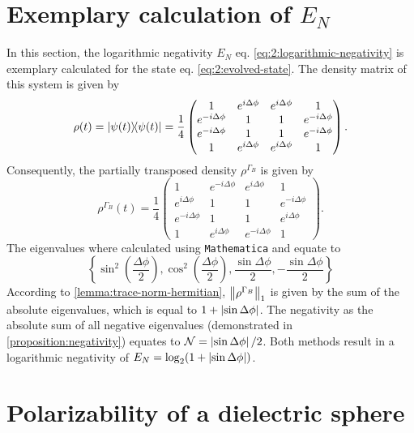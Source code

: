 \section{Exemplary calculation of $E_N$}
\label{apx:E_N-exemplary}
In this section, the logarithmic negativity $E_N$ eq. \eqref{eq:2:logarithmic-negativity} is exemplary calculated for the state eq. \eqref{eq:2:evolved-state}.
The density matrix of this system is given by
\begin{equation}
  \rho(t) = \ketbra{\psi(t)} = \frac{1}{4}
  \begin{pmatrix}
    1 & e^{i\Delta\phi}  & e^{i\Delta\phi} & 1 \\
    e^{-i\Delta\phi} & 1 & 1  & e^{-i\Delta\phi} \\
    e^{-i\Delta\phi} & 1  & 1 & e^{-i\Delta\phi} \\
    1 & e^{i\Delta\phi} & e^{i\Delta\phi} & 1
  \end{pmatrix}.
\end{equation}
Consequently, the partially transposed density $\rho^{\Gamma_B}$ is given by
\begin{equation}
  \rho^{\Gamma_B}(t) = \frac{1}{4}
  \begin{pmatrix}
    1 & e^{-i\Delta\phi}  & e^{i\Delta\phi} & 1 \\
    e^{i\Delta\phi} & 1 & 1  & e^{-i\Delta\phi} \\
    e^{-i\Delta\phi} & 1  & 1 & e^{i\Delta\phi} \\
    1 & e^{i\Delta\phi} & e^{-i\Delta\phi} & 1
  \end{pmatrix}.
\end{equation}
The eigenvalues where calculated using \texttt{Mathematica} and equate to
\begin{equation*}
  \left\{ \sin^2\left(\frac{\Delta\phi}{2}\right), \cos^2\left(\frac{\Delta\phi}{2}\right), \frac{\sin\Delta\phi}{2}, -\frac{\sin\Delta\phi}{2} \right\}
\end{equation*}
According to \cref{lemma:trace-norm-hermitian}, $\left\lVert\rho^{\Gamma_B}\right\rVert_1$ is given by the sum of the absolute eigenvalues, which is equal to $1+\left\lvert\sin\Delta\phi\right\rvert$. The negativity as the absolute sum of all negative eigenvalues (demonstrated in \cref{proposition:negativity}) equates to $\mathcal{N} = \left\lvert\sin\Delta\phi\right\rvert/2$. Both methods result in a logarithmic negativity of $E_N = \log_2(1 + \left\lvert\sin\Delta\phi\right\rvert)$.




\section{Polarizability of a dielectric sphere}
\label{apx:polarizability-sphere}


